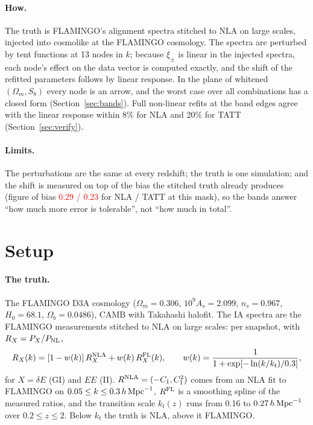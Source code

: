\documentclass[11pt]{article}
\newcommand{\hMpc}{\,h\,{\rm Mpc}^{-1}}
\newcommand{\PNL}{P_{\rm NL}}
\newif\ifnumbersfinal
\newcommand{\refresh}[1]{\ifnumbersfinal#1\else\textcolor{red}{#1}\fi}
\newcommand{\BaseThree}{\refresh{0.29 / 0.23}}
\newcommand{\Nnodes}{13}
\begin{document}
\paragraph{How.}
The truth is FLAMINGO's alignment spectra stitched to NLA on large scales,
injected into cosmolike at the FLAMINGO cosmology. The spectra are
perturbed by tent functions at \Nnodes{} nodes in $k$; because $\xi_\pm$ is
linear in the injected spectra, each node's effect on the data vector is
computed exactly, and the shift of the refitted parameters follows by
linear response. In the plane of whitened $(\Omega_m, S_8)$ every node is
an arrow, and the worst case over all combinations has a closed form
(Section~\ref{sec:bands}). Full non-linear refits at the band edges agree
with the linear response within 8\% for NLA and 20\% for TATT
(Section~\ref{sec:verify}).

\paragraph{Limits.}
The perturbations are the same at every redshift; the truth is one
simulation; and the shift is measured on top of the bias the stitched truth
already produces (figure of bias \BaseThree{} for NLA / TATT at this mask),
so the bands answer ``how much more error is tolerable'', not ``how much in
total''.

\section{Setup}
\label{sec:setup}

\paragraph{The truth.}
The FLAMINGO D3A cosmology ($\Omega_m = 0.306$, $10^9 A_s = 2.099$,
$n_s = 0.967$, $H_0 = 68.1$, $\Omega_b = 0.0486$), CAMB with Takahashi
halofit. The IA spectra are the FLAMINGO measurements stitched to NLA on
large scales: per snapshot, with $R_X = P_X/\PNL$,
\begin{equation}
  R_X(k) = \left[1 - w(k)\right] R_X^{\rm NLA} + w(k)\, R_X^{\rm FL}(k),
  \qquad
  w(k) = \frac{1}{1 + \exp\!\left[-\ln(k/k_t)/0.3\right]},
  \label{eq:stitch}
\end{equation}
for $X = \delta E$ (GI) and $EE$ (II). $R^{\rm NLA} = (-C_1, C_1^2)$ comes
from an NLA fit to FLAMINGO on $0.05 \le k \le 0.3\hMpc$, $R^{\rm FL}$ is a
smoothing spline of the measured ratios, and the transition scale $k_t(z)$
runs from 0.16 to $0.27\hMpc$ over $0.2 \le z \le 2$. Below $k_t$ the truth
is NLA, above it FLAMINGO.
\end{document}
